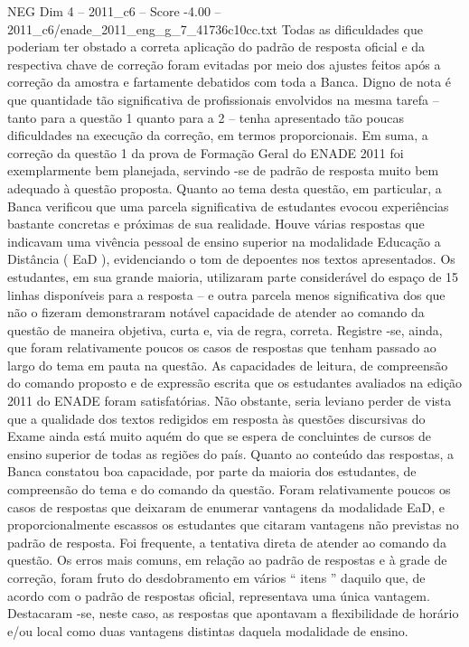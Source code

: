 \begin{textsample}{NEG Dim 4 – 2011\_c6 – Score -4.00 – 2011\_c6/enade\_2011\_eng\_g\_7\_41736c10cc.txt}
Todas as dificuldades que poderiam ter obstado a correta aplicação do padrão de resposta oficial e da respectiva chave de correção foram evitadas por meio dos ajustes feitos após a correção da amostra e fartamente debatidos com toda a Banca.
Digno de nota é que quantidade tão significativa de profissionais envolvidos na mesma tarefa – tanto para a questão 1 quanto para a 2 – tenha apresentado tão poucas dificuldades na execução da correção, em termos proporcionais.
Em suma, a correção da questão 1 da prova de Formação Geral do ENADE 2011 foi exemplarmente bem planejada, servindo -se de padrão de resposta muito bem adequado à questão proposta.
Quanto ao tema desta questão, em particular, a Banca verificou que uma parcela significativa de estudantes evocou experiências bastante concretas e próximas de sua realidade.
Houve várias respostas que indicavam uma vivência pessoal de ensino superior na modalidade Educação a Distância ( EaD ), evidenciando o tom de depoentes nos textos apresentados.
Os estudantes, em sua grande maioria, utilizaram parte considerável do espaço de 15 linhas disponíveis para a resposta – e outra parcela menos significativa dos que não o fizeram demonstraram notável capacidade de atender ao comando da questão de maneira objetiva, curta e, via de regra, correta.
Registre -se, ainda, que foram relativamente poucos os casos de respostas que tenham passado ao largo do tema em pauta na questão.
As capacidades de leitura, de compreensão do comando proposto e de expressão escrita que os estudantes avaliados na edição 2011 do ENADE foram satisfatórias.
Não obstante, seria leviano perder de vista que a qualidade dos textos redigidos em resposta às questões discursivas do Exame ainda está muito aquém do que se espera de concluintes de cursos de ensino superior de todas as regiões do país.
Quanto ao conteúdo das respostas, a Banca constatou boa capacidade, por parte da maioria dos estudantes, de compreensão do tema e do comando da questão.
Foram relativamente poucos os casos de respostas que deixaram de enumerar vantagens da modalidade EaD, e proporcionalmente escassos os estudantes que citaram vantagens não previstas no padrão de resposta.
Foi frequente, a tentativa direta de atender ao comando da questão.
Os erros mais comuns, em relação ao padrão de respostas e à grade de correção, foram fruto do desdobramento em vários “ itens ” daquilo que, de acordo com o padrão de respostas oficial, representava uma única vantagem.
Destacaram -se, neste caso, as respostas que apontavam a flexibilidade de horário e/ou local como duas vantagens distintas daquela modalidade de ensino.

\end{textsample}
